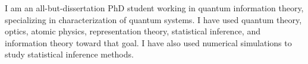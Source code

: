 

\begin{cvparagraph}

I am an all-but-dissertation PhD student working in quantum information theory, specializing in
characterization of quantum systems. I have used quantum theory, optics, atomic physics, representation theory, statistical inference, and information theory toward that goal. I have also used numerical simulations to study statistical inference methods.
\end{cvparagraph}
